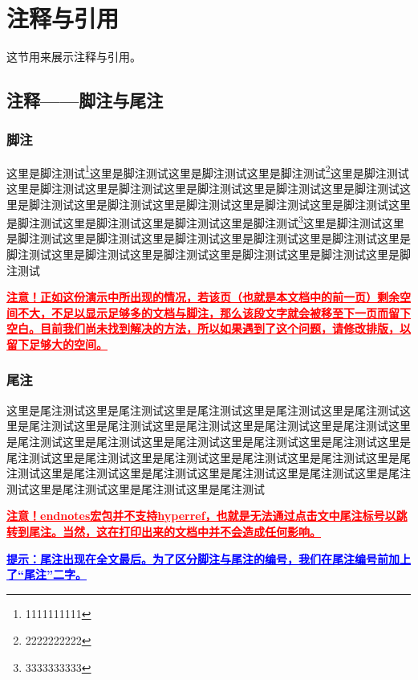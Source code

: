 \section{注释与引用}这节用来展示注释与引用。

\subsection{注释——脚注与尾注}
\subsubsection{脚注}
\par 这里是脚注测试\footnote{1111111111}这里是脚注测试这里是脚注测试这里是脚注测试\footnote{2222222222}这里是脚注测试这里是脚注测试这里是脚注测试这里是脚注测试这里是脚注测试这里是脚注测试这里是脚注测试这里是脚注测试这里是脚注测试这里是脚注测试这里是脚注测试这里是脚注测试这里是脚注测试这里是脚注测试这里是脚注测试\footnote{3333333333}这里是脚注测试这里是脚注测试这里是脚注测试这里是脚注测试这里是脚注测试这里是脚注测试这里是脚注测试这里是脚注测试这里是脚注测试这里是脚注测试这里是脚注测试这里是脚注测试

\textcolor{red}{\textbf{\uline{注意！正如这份演示中所出现的情况，若该页（也就是本文档中的前一页）剩余空间不大，不足以显示足够多的文档与脚注，那么该段文字就会被移至下一页而留下空白。目前我们尚未找到解决的方法，所以如果遇到了这个问题，请修改排版，以留下足够大的空间。}}}

\subsubsection{尾注}
\par 这里是尾注测试这里是尾注测试这里是尾注测试这里是尾注测试这里是尾注测试这里是尾注测试这里是尾注测试这里是尾注测试这里是尾注测试这里是尾注测试这里是尾注测试这里是尾注测试这里是尾注测试这里是尾注测试这里是尾注测试这里是尾注测试这里是尾注测试这里是尾注测试这里是尾注测试这里是尾注测试这里是尾注测试这里是尾注测试这里是尾注测试这里是尾注测试这里是尾注测试这里是尾注测试这里是尾注测试这里是尾注测试这里是尾注测试

\par \textcolor{red}{\textbf{\uline{注意！endnotes宏包并不支持hyperref，也就是无法通过点击文中尾注标号以跳转到尾注。当然，这在打印出来的文档中并不会造成任何影响。}}}
\par \textcolor{blue}{\textbf{\uline{提示：尾注出现在全文最后。为了区分脚注与尾注的编号，我们在尾注编号前加上了“尾注”二字。}}}

